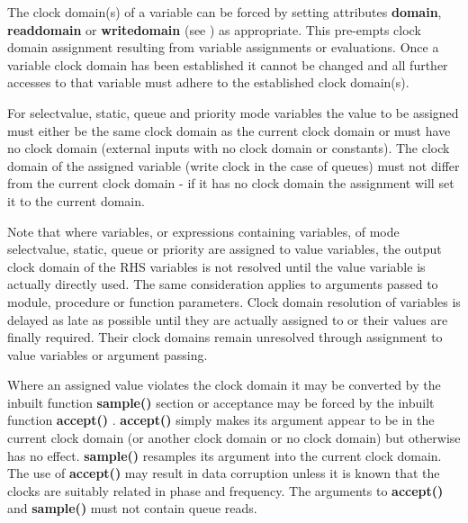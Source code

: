            The clock domain(s) of a variable can be forced by setting
            attributes {\bf domain}, {\bf readdomain} or {\bf writedomain}
            (see ) as appropriate. This pre-empts
            clock domain assignment resulting from variable assignments or
            evaluations. Once a variable clock domain has been established
            it cannot be changed and all further accesses to that variable
            must adhere to the established clock domain(s).
            
            For selectvalue, static, queue and priority mode variables the value
            to be assigned must either be the same clock domain as the current
            clock domain or must have no clock domain (external inputs with no
            clock domain or constants). The clock domain of the assigned
            variable (write clock in the case of queues) must not differ from
            the current clock domain - if it has no clock domain the
            assignment will set it to the current domain.
            
            Note that where variables, or expressions containing variables, of
            mode selectvalue, static, queue or priority are assigned to value
            variables, the output clock domain of the RHS variables is not
            resolved until the value variable is actually directly used. The
            same consideration applies to arguments passed to module, procedure
            or function parameters. Clock domain resolution of variables is
            delayed as late as possible until they are actually assigned to or
            their values are finally required. Their clock domains remain
            unresolved through assignment to value variables or argument
            passing.
            
            Where an assigned value violates the clock domain it may be converted
            by the inbuilt function {\bf sample()} section 
            or acceptance may be forced by the inbuilt function {\bf accept()}
            . {\bf accept()} simply makes its argument
            appear to be in the current clock domain (or another clock domain or no
            clock domain) but otherwise has no effect. {\bf sample()} resamples its
            argument into the current clock domain. The use of {\bf accept()} may
            result in data corruption unless it is known that the clocks are
            suitably related in phase and frequency. The arguments to {\bf
            accept()} and {\bf sample()} must not contain queue reads.

